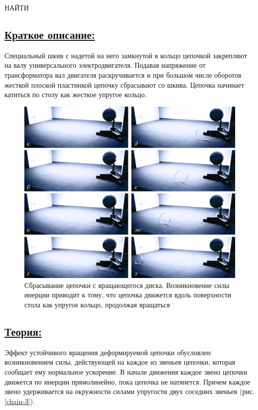 \documentclass[14pt,a4paper,twoside]{extarticle}	%
\begin{document}
		НАЙТИ
		
		\subsection*{\underline{Краткое описание:}}
				
		Специальный шкив с надетой на него замкнутой в кольцо цепочкой закрепляют на валу универсального электродвигателя.
		Подавая напряжение от трансформатора вал двигателя раскручивается и при большом числе оборотов жесткой плоской пластинкой цепочку сбрасывают со шкива.
		Цепочка начинает катиться по столу как жесткое упругое кольцо.

	\begin{figure}[H] 	
	\centering 	
	\includegraphics[width=0.9\linewidth]{chain-2.png}
	\caption{Сбрасывание цепочки с вращающегося диска. Возникновение силы инерции приводит к тому, что цепочка движется вдоль поверхности стола как упругое кольцо, продолжая вращаться}
	\label{chain-2}
\end{figure}
		
	\subsection*{\underline{Теория:}}
		
Эффект устойчивого вращения деформируемой цепочки обусловлен возникновением силы, действующей на каждое из звеньев цепочки, которая сообщает ему нормальное ускорение.
В начале движения каждое звено цепочки движется по инерции прямолинейно, пока цепочка не натянется.
Причем каждое звено удерживается на окружности силами упругости двух соседних звеньев (рис.\ref{chain-3}).
		
\end{document}
